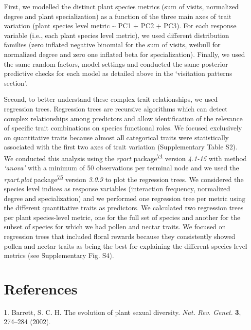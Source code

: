 \documentclass[12pt,a4paper,]{article}
\begin{document}
First, we modelled the distinct plant species metrics (sum of visits,
normalized degree and plant specialization) as a function of the three
main axes of trait variation (plant species level metric
\textasciitilde{} PC1 + PC2 + PC3). For each response variable (i.e.,
each plant species level metric), we used different distribution
families (zero inflated negative binomial for the sum of visits, weibull
for normalized degree and zero one inflated beta for specialization).
Finally, we used the same random factors, model settings and conducted
the same posterior predictive checks for each model as detailed above in
the `visitation patterns section'.

Second, to better understand these complex trait relationships, we used
regression trees. Regression trees are recursive algorithms which can
detect complex relationships among predictors and allow identification
of the relevance of specific trait combinations on species functional
roles. We focused exclusively on quantitative traits because almost all
categorical traits were statistically associated with the first two axes
of trait variation (Supplementary Table S2). We conducted this analysis
using the \emph{rpart}
package\textsuperscript{\protect\hyperlink{ref-therneau2015}{74}}
version \emph{4.1-15} with method \emph{`anova'} with a minimum of 50
observations per terminal node and we used the \emph{rpart.plot}
package\textsuperscript{\protect\hyperlink{ref-milborrow2015}{75}}
version \emph{3.0.9} to plot the regression trees. We considered the
species level indices as response variables (interaction frequency,
normalized degree and specialization) and we performed one regression
tree per metric using the different quantitative traits as predictors.
We calculated two regression trees per plant species-level metric, one
for the full set of species and another for the subset of species for
which we had pollen and nectar traits. We focused on regression trees
that included floral rewards because they consistently showed pollen and
nectar traits as being the best for explaining the different
species-level metrics (see Supplementary Fig. S4).

\section{References}\label{references}

\hypertarget{refs}{}
\hypertarget{ref-barrett2002}{}
1. Barrett, S. C. H. The evolution of plant sexual diversity. \emph{Nat.
Rev. Genet.} \textbf{3}, 274--284 (2002).
\end{document}
